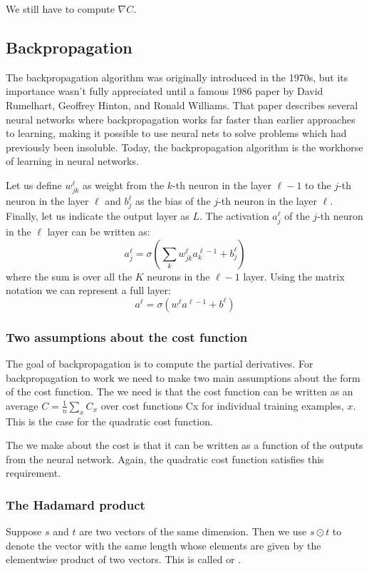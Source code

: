 We still have to compute $\nabla C$.

\subsection{Backpropagation}
The backpropagation algorithm was originally introduced in the 1970s, but its importance wasn't fully appreciated until a famous 1986 paper by David Rumelhart, Geoffrey Hinton, and Ronald Williams. That paper describes several neural networks where backpropagation works far faster than earlier approaches to learning, making it possible to use neural nets to solve problems which had previously been insoluble. Today, the backpropagation algorithm is the workhorse of learning in neural networks.

Let us define $w_{jk}^{\ell}$ as weight from the $k$-th neuron in the layer $\ell-1$ to the $j$-th neuron in the layer $\ell$ and $b^\ell_j$ as the bias of the $j$-th neuron in the layer $\ell$. Finally, let us indicate the output layer as $L$. The activation $a_j^\ell$ of the $j$-th neuron in the $\ell$ layer can be written as:
\begin{equation}
a_j^\ell = \sigma \left(\sum_k w_{jk}^\ell a_k^{\ell-1} + b_j^\ell\right)
\end{equation}
where the sum is over all the $K$ neurons in the $\ell-1$ layer. Using the matrix notation we can represent a full layer:
\begin{equation}
a^\ell = \sigma \left( w^\ell a^{\ell-1} +b^\ell\right)
\end{equation}
\subsubsection{Two assumptions about the cost function}
The goal of backpropagation is to compute the partial derivatives. For backpropagation to work we need to make two main assumptions about the form of the cost function. 
The  we need is that the cost function can be written as an average $C=\frac{1}{n}\sum_x C_x$ over cost functions Cx for individual training examples, $x$. This is the case for the quadratic cost function.

The  we make about the cost is that it can be written as a function of the outputs from the neural network. Again, the quadratic cost function satisfies this requirement.
\subsubsection{The Hadamard product}
Suppose $s$ and $t$ are two vectors of the same dimension. Then we use $s\odot t$ to denote the vector with the same length whose elements are given by the elementwise product of two vectors.
This is called  or .

